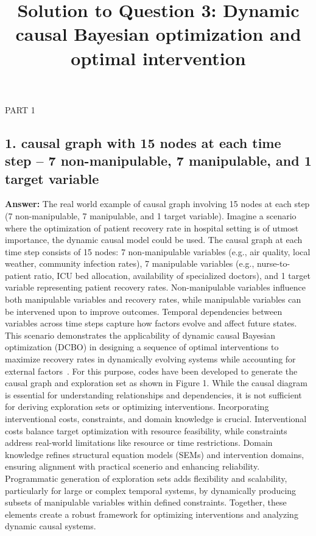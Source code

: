 \documentclass[a4paper,10pt]{article}
\title{Solution to Question 3: Dynamic causal Bayesian optimization and optimal intervention}
\author{}
\date{}
\begin{document}
\maketitle

PART 1 
\subsection*{1. causal graph with 15 nodes at each time step -- 7 non-manipulable, 7 manipulable, and 1 target variable}

\textbf{Answer:} The real world example of causal graph involving 15 nodes at each step (7 non-manipulable, 7 manipulable, and 1 target variable). Imagine a scenario where the optimization of patient recovery rate in hospital setting is of utmost importance, the dynamic causal model could be used. The causal graph at each time step consists of 15 nodes: 7 non-manipulable variables (e.g., air quality, local weather, community infection rates), 7 manipulable variables (e.g., nurse-to-patient ratio, ICU bed allocation, availability of specialized doctors), and 1 target variable representing patient recovery rates. Non-manipulable variables influence both manipulable variables and recovery rates, while manipulable variables can be intervened upon to improve outcomes. Temporal dependencies between variables across time steps capture how factors evolve and affect future states. This scenario demonstrates the applicability of dynamic causal Bayesian optimization (DCBO) in designing a sequence of optimal interventions to maximize recovery rates in dynamically evolving systems while accounting for external factors~\cite{aglietti2021dynamic}. For this purpose, codes have been developed to generate the causal graph and exploration set as shown in Figure 1.  While the causal diagram is essential for understanding relationships and dependencies, it is not sufficient for deriving exploration sets or optimizing interventions. Incorporating interventional costs, constraints, and domain knowledge is crucial. Interventional costs balance target optimization with resource feasibility, while constraints address real-world limitations like resource or time restrictions. Domain knowledge refines structural equation models (SEMs) and intervention domains, ensuring alignment with practical scenerio and enhancing reliability. Programmatic generation of exploration sets adds flexibility and scalability, particularly for large or complex temporal systems, by dynamically producing subsets of manipulable variables within defined constraints. Together, these elements create a robust framework for optimizing interventions and analyzing dynamic causal systems.
\end{document}
